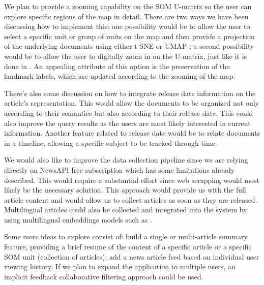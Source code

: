 \documentclass[a4paper]{article}
\begin{document}
We plan to provide a zooming capability on the SOM U-matrix so the user can explore specific regions of the map in detail. There are two ways we have been discussing how to implement this: one possibility would be to allow the user to select a specific unit or group of units on the map and then provide a projection of the underlying documents using either t-SNE \citep{vandermaaten2008} or UMAP \citep{mcinnes2020}; a second possibility would be to allow the user to digitally zoom in on the U-matrix, just like it is done in \citet{kaski1998}. An appealing attribute of this option is the preservation of the landmark labels, which are updated according to the zooming of the map.

There's also some discussion on how to integrate release date information on the article's representation. This would allow the documents to be organized not only according to their semantics but also according to their release date. This could also improve the query results as the users are most likely interested in current information. Another feature related to release date would be to relate documents in a timeline, allowing a specific subject to be tracked through time. 

We would also like to improve the data collection pipeline since we are relying directly on NewsAPI free subscription which has some limitations already described. This would require a substantial effort since web scrapping would most likely be the necessary solution. This approach would provide us with the full article content and would allow us to collect articles as soon as they are released. Multilingual articles could also be collected and integrated into the system by using multilingual embeddings models such as \citet{conneau2019}.

Some more ideas to explore consist of: build a single or multi-article summary feature, providing a brief resume of the content of a specific article or a specific SOM unit (collection of articles); add a news article feed based on individual user viewing history. If we plan to expand the application to multiple users, an implicit feedback collaborative filtering \citep{hu2008} approach could be used.



\end{document}
